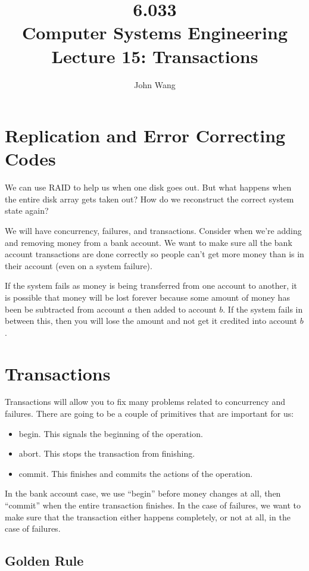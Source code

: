 \documentclass[psamsfonts]{amsart}
\title{6.033 \\
Computer Systems Engineering \\
Lecture 15: Transactions}
\author{John Wang}
\begin{document}
\maketitle

\section{Replication and Error Correcting Codes}

We can use RAID to help us when one disk goes out. But what happens when the entire disk array gets taken out? How do we reconstruct the correct system state again?

We will have concurrency, failures, and transactions. Consider when we're adding and removing money from a bank account. We want to make sure all the bank account transactions are done correctly so people can't get more money than is in their account (even on a system failure).

If the system fails as money is being transferred from one account to another, it is possible that money will be lost forever because some amount of money has been be subtracted from account $a$ then added to account $b$. If the system fails in between this, then you will lose the amount and not get it credited into account $b$.

\section{Transactions}

Transactions will allow you to fix many problems related to concurrency and failures. There are going to be a couple of primitives that are important for us:

\begin{itemize}
  \item begin. This signals the beginning of the operation.
  \item abort. This stops the transaction from finishing.
  \item commit. This finishes and commits the actions of the operation.
\end{itemize}

In the bank account case, we use ``begin'' before money changes at all, then ``commit'' when the entire transaction finishes. In the case of failures, we want to make sure that the transaction either happens completely, or not at all, in the case of failures.

\subsection{Golden Rule}
\end{document}
